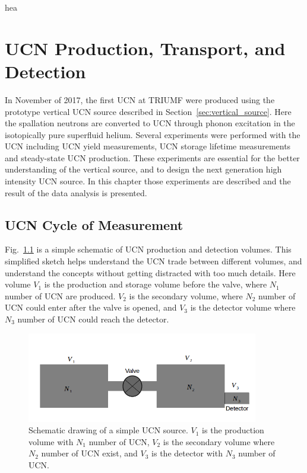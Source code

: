 hea\chapter{UCN Production, Transport, and Detection\label{chap:UCNresult}}

In November of 2017, the first UCN at TRIUMF were produced using the
prototype vertical UCN source described in
Section~\ref{sec:vertical_source}. Here the spallation neutrons are
converted to UCN through phonon excitation in the isotopically pure
superfluid helium. Several experiments were performed with the UCN
including UCN yield measurements, UCN storage lifetime measurements
and steady-state UCN production. These experiments are essential for
the better understanding of the vertical source, and to design the next
generation high intensity UCN source. In this chapter those
experiments are described and the result of the data analysis is
presented.

\section{UCN Cycle of Measurement}
Fig.~\ref{fig:volume_schematic} is a simple schematic of UCN
production and detection volumes. This simplified sketch helps
understand the UCN trade between different volumes, and understand the
concepts without getting distracted with too much details. Here volume
$V_1$ is the production and storage volume before the valve, where
$N_1$ number of UCN are produced. $V_2$ is the secondary volume, where
$N_2$ number of UCN could enter after the valve is opened, and $V_3$
is the detector volume where $N_3$ number of UCN could reach the
detector.



\begin{figure}[h]
  \centering
  \includegraphics[width=0.9\textwidth]{volume_schematic.png}
  \caption{Schematic drawing of a simple UCN source. $V_1$ is the
    production volume with $N_1$ number of UCN, $V_2$ is the secondary
    volume where $N_2$ number of UCN exist, and $V_3$ is the detector
    with $N_3$ number of UCN. }
  \label{fig:volume_schematic}
\end{figure}


